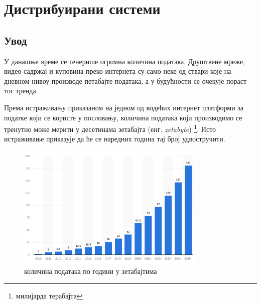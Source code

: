 \documentclass[12pt,oneside]{memoir}
\begin{document}


\chapter{Дистрибуирани системи}
\label{chp:dist_sis}

\section{Увод}
\label{sec:uvod}

У данашње време се генерише огромна количина података. Друштвене мреже, видео садржај и куповина преко интернета су само неке од ствари које на дневном нивоу производе петабајте података, а у будућности се очекује пораст тог тренда.

Према истраживању приказаном на једном од водећих интернет платформи за податке који се користе у пословању, количина података који производимо се тренутно може мерити у десетинама зетабајта (енг. \textit{zetabyte}) \footnote{милијарда терабајта}. Исто истраживање приказује да ће се наредних година тај број удвостручити. \cite{volume_data}

\begin{figure}[!ht]
  \centering
  \includegraphics[width=0.8\textwidth]{pictures/Total_data_volume_worldwide_2010_2025_statista.png}
  \caption{количина података по години у зетабајтима}
  \label{fig:kolicina_podataka}
\end{figure}
\end{document}
